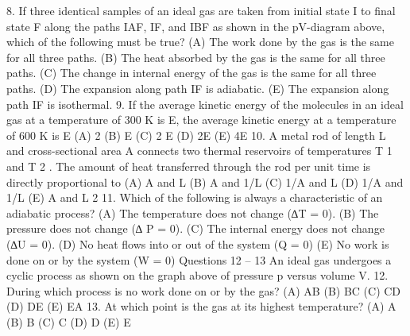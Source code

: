 8. If three identical samples of an ideal gas are taken from initial state I to final state F along the paths IAF, IF, and
IBF as shown in the pV-diagram above, which of the following must be true?
(A) The work done by the gas is the same for all three paths.
(B) The heat absorbed by the gas is the same for all three paths.
(C) The change in internal energy of the gas is the same for all three paths.
(D) The expansion along path IF is adiabatic.
(E) The expansion along path IF is isothermal.
9. If the average kinetic energy of the molecules in an ideal gas at a temperature of 300 K is E, the average kinetic
energy at a temperature of 600 K is
E
(A)
2
(B) E
(C)
2 E
(D) 2E
(E) 4E
10. A metal rod of length L and cross-sectional area A connects two thermal reservoirs of temperatures T 1 and T 2 .
The amount of heat transferred through the rod per unit time is directly proportional to
(A) A and L
(B) A and 1/L
(C) 1/A and L
(D) 1/A and 1/L
(E)
A and L 2
11. Which of the following is always a characteristic of an adiabatic process?
(A) The temperature does not change (∆T = 0).
(B) The pressure does not change (∆ P = 0).
(C) The internal energy does not change (∆U = 0).
(D) No heat flows into or out of the system (Q = 0)
(E) No work is done on or by the system (W = 0)
Questions 12 – 13
An ideal gas undergoes a cyclic process as shown on the graph above of pressure p versus volume V.
12. During which process is no work done on or by the gas?
(A) AB
(B) BC
(C) CD
(D) DE
(E) EA
13. At which point is the gas at its highest temperature?
(A) A
(B) B
(C) C
(D) D
(E) E



